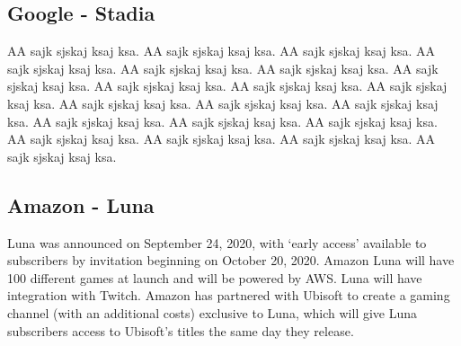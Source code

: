 \subsection{Google - Stadia}
AA sajk sjskaj ksaj ksa. AA sajk sjskaj ksaj ksa. AA sajk sjskaj ksaj ksa. AA sajk sjskaj ksaj ksa. AA sajk sjskaj ksaj ksa. AA sajk sjskaj ksaj ksa. AA sajk sjskaj ksaj ksa. AA sajk sjskaj ksaj ksa. AA sajk sjskaj ksaj ksa. AA sajk sjskaj ksaj ksa. AA sajk sjskaj ksaj ksa. AA sajk sjskaj ksaj ksa. AA sajk sjskaj ksaj ksa. AA sajk sjskaj ksaj ksa. AA sajk sjskaj ksaj ksa. AA sajk sjskaj ksaj ksa. AA sajk sjskaj ksaj ksa. AA sajk sjskaj ksaj ksa. AA sajk sjskaj ksaj ksa. AA sajk sjskaj ksaj ksa\cite{Google_Stadia}.
\subsection{Amazon - Luna}
Luna was announced on September 24, 2020, with ‘early access’ available to subscribers by invitation beginning on October 20, 2020. Amazon Luna will have 100 different games at launch and will be powered by AWS. Luna will have integration with Twitch. Amazon has partnered with Ubisoft to create a gaming channel (with an additional costs) exclusive to Luna, which will give Luna subscribers access to Ubisoft's titles the same day they release\cite{Amazon_Luna}.